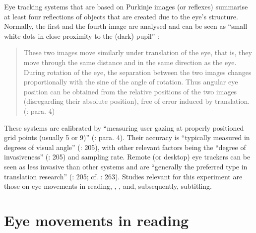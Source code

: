 Eye tracking systems that are based on Purkinje images (or reflexes) summarise at least four reflections of objects that are created due to the eye’s structure. Normally, the first and the fourth image are analysed and can be seen as “small white dots in close proximity to the (dark) pupil” \citep{Curtis2015}:
\begin{quote}
These two images move similarly under translation of the eye, that is, they move through the same distance and in the same direction as the eye. During rotation of the eye, the separation between the two images changes proportionally with the sine of the angle of rotation. Thus angular eye position can be obtained from the relative positions of the two images (disregarding their absolute position), free of error induced by translation. (\citealt{Ku_leuven????}: para. 4)
\end{quote}
These  systems are calibrated by “measuring user gazing at properly positioned grid points (usually 5 or 9)” (\citealt{Ku_leuven????}: para. 4). Their accuracy is “typically measured in degrees of visual angle” (\citealt{Hvelplund2014}: 205), with other relevant factors being the “degree of invasiveness” (\citeyear{Hvelplund2014}: 205) and sampling rate. Remote (or desktop) eye trackers can be seen as less invasive than other systems and are “generally the preferred type in translation research” (\citealt{Hvelplund2014}: 205; cf. \citealt{obrien2009}: 263). Studies relevant for this experiment are those on eye movements in reading, , , and, subsequently, subtitling.

\section{Eye movements in reading}\label{sec:6.2}

